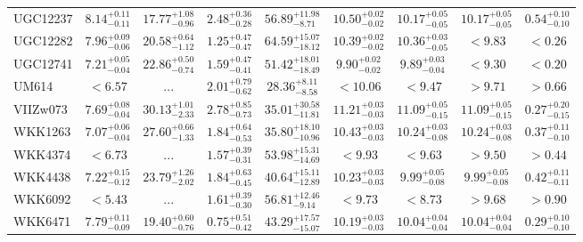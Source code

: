 \documentclass[onecolumn]{mn2e}
\begin{document}
{\begin{center}
\begin{longtable}{lcccccccc}
UGC12237 & $8.14_{-0.11}^{+0.11}$ & $17.77_{-0.96}^{+1.08}$ & $2.48_{-0.28}^{+0.36}$ &$56.89_{-8.71}^{+11.98}$ & $10.50_{-0.02}^{+0.02}$ & $10.17_{-0.05}^{+0.05}$ & $10.17_{-0.05}^{+0.05}$ & $0.54_{-0.10}^{+0.10}$ \\
UGC12282 & $7.96_{-0.06}^{+0.09}$ & $20.58_{-1.12}^{+0.64}$ & $1.25_{-0.47}^{+0.47}$ &$64.59_{-18.12}^{+15.07}$ & $10.39_{-0.02}^{+0.02}$ & $10.36_{-0.05}^{+0.03}$ & $<9.83$ & $<0.26$ \\
UGC12741 & $7.21_{-0.04}^{+0.05}$ & $22.86_{-0.74}^{+0.50}$ & $1.59_{-0.41}^{+0.47}$ &$51.42_{-18.49}^{+18.01}$ & $9.90_{-0.02}^{+0.02}$ & $9.89_{-0.04}^{+0.03}$ & $<9.30$ & $<0.20$ \\
UM614 & $<6.57$ & ... & $2.01_{-0.62}^{+0.79}$ &$28.36_{-8.58}^{+8.11}$ & $<10.06$ & $<9.47$ & $>9.71$ & $>0.66$ \\
VIIZw073 & $7.69_{-0.04}^{+0.08}$ & $30.13_{-2.33}^{+1.01}$ & $2.78_{-0.73}^{+0.85}$ &$35.01_{-11.81}^{+30.58}$ & $11.21_{-0.03}^{+0.03}$ & $11.09_{-0.15}^{+0.05}$ & $11.09_{-0.15}^{+0.05}$ & $0.27_{-0.15}^{+0.20}$ \\
WKK1263 & $7.07_{-0.04}^{+0.06}$ & $27.60_{-1.33}^{+0.66}$ & $1.84_{-0.53}^{+0.64}$ &$35.80_{-10.96}^{+18.10}$ & $10.43_{-0.03}^{+0.03}$ & $10.24_{-0.08}^{+0.03}$ & $10.24_{-0.08}^{+0.03}$ & $0.37_{-0.10}^{+0.11}$ \\
WKK4374 & $<6.73$ & ... & $1.57_{-0.31}^{+0.39}$ &$53.98_{-14.69}^{+15.31}$ & $<9.93$ & $<9.63$ & $>9.50$ & $>0.44$ \\
WKK4438 & $7.22_{-0.12}^{+0.15}$ & $23.79_{-2.02}^{+1.26}$ & $1.84_{-0.45}^{+0.63}$ &$40.64_{-12.89}^{+15.11}$ & $10.23_{-0.03}^{+0.03}$ & $9.99_{-0.08}^{+0.05}$ & $9.99_{-0.08}^{+0.05}$ & $0.42_{-0.11}^{+0.11}$ \\
WKK6092 & $<5.43$ & ... & $1.61_{-0.30}^{+0.39}$ &$56.81_{-9.14}^{+12.46}$ & $<9.73$ & $<8.73$ & $>9.68$ & $>0.90$ \\
WKK6471 & $7.79_{-0.09}^{+0.11}$ & $19.40_{-0.76}^{+0.60}$ & $0.75_{-0.42}^{+0.51}$ &$43.29_{-15.07}^{+17.57}$ & $10.19_{-0.03}^{+0.03}$ & $10.04_{-0.04}^{+0.04}$ & $10.04_{-0.04}^{+0.04}$ & $0.29_{-0.10}^{+0.10}$ \\
\end{longtable}
\end{center}
}
\end{document}
